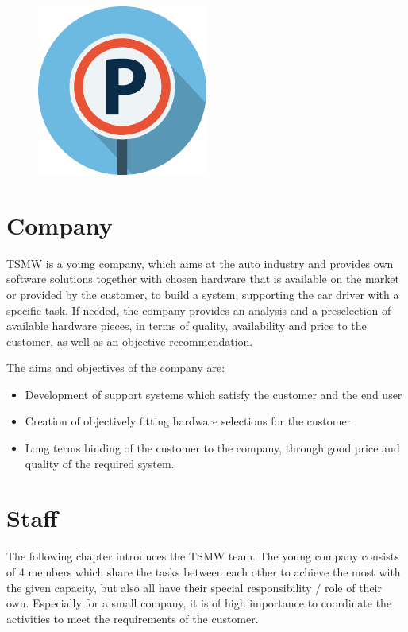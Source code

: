 
\begin{figure}[h]
\centering
\includegraphics[width=0.5\textwidth]{res/intro/logo.png}
\end{figure}

\section{Company}
TSMW is a young company, which aims at the auto industry and provides own
software solutions together with chosen hardware that is available on the market
or provided by the customer, to build a system, supporting the car driver with a
specific task. If needed, the company provides an analysis and a preselection of
available hardware pieces, in terms of quality, availability and price to the
customer, as well as an objective recommendation.

The aims and objectives of the company are:

\begin{itemize}
  \item Development of support systems which satisfy the customer and the end
  user
  \item Creation of objectively fitting hardware selections for the customer 
  \item Long terms binding of the customer to the company, through good price
  and quality of the required system.
\end{itemize}

\section{Staff}
The following chapter introduces the TSMW team. The young company consists of 4
members which share the tasks between each other to achieve the most with the
given capacity, but also all have their special responsibility / role of their
own. Especially for a small company, it is of high importance to coordinate the
activities to meet the requirements of the customer.

